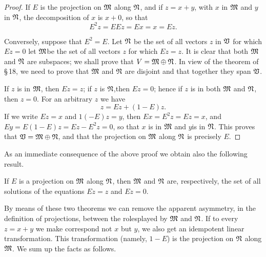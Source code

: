 \begin{proof}
    If \(E\) is the projection on \(\frak{M}\) along \(\frak{N}\), and if \(z =
    x + y\), with \(x\) in \(\frak{M}\) and \(y\) in \(\frak{N}\), the
    decomposition of \(x\) is \(x + 0\), so that
    \begin{equation*}
        E^2 z = EEz = Ex = x = Ez.
    \end{equation*}

    Conversely, suppose that \(E^2 = E\). Let \(\frak{N}\) be the set of all
    vectors \(z\) in \(\mathfrak{V}\) for which \(Ez = 0\) let \(\frak{M}\)be the set
    of all vectors \(z\) for which \(Ez = z\). It is clear that both
    \(\frak{M}\) and \(\frak{N}\) are subspaces; we shall prove that \(V =
    \frak{M} \oplus \frak{N}\). In view of the theorem of \S\,18, we need to
    prove that \(\frak{M}\) and \(\frak{N}\) are disjoint and that together they
    span \(\mathfrak{V}\).

    If \(z\) is in \(\frak{M}\), then \(Ez = z\); if \(z\) is \(\frak{N}\),then
    \(Ez = 0\); hence if \(z\) is in both \(\frak{M}\) and \(\frak{N}\), then
    \(z = 0\). For an arbitrary \(z\) we have
    \begin{equation}
        z = Ez + (1 - E)z.
    \end{equation}
    If we write \(Ez = x\) and \(1( - E)z = y\), then \(Ex = E^2z = Ez = x\),
    and \(Ey = E(1- E)z= Ez - E^2z = 0\), so that \(x\) is in \(\frak{M}\) and
    \(y\)is in \(\frak{N}\). This proves that \(\mathfrak{V} = \frak{M} \oplus
    \frak{N}\), and that the projection on \(\frak{M}\) along \(\frak{N}\) is
    precisely \(E\).
\end{proof}

As an immediate consequence of the above proof we obtain also the following result.

\begin{theorem}
    If \(E\) is a projection on \(\frak{M}\) along \(\frak{N}\), then \(\frak{M}\) and \(\frak{N}\) are, respectively, the set of all solutions of the equations \(Ez = z\) and \(Ez = 0\).
\end{theorem}

By means of these two theorems we can remove the apparent asymmetry, in the
definition of projections, between the rolesplayed by \(\frak{M}\) and
\(\frak{N}\). If to every \(z = x + y\) we make correspond not \(x\) but \(y\),
we also get an idempotent linear transformation. This transformation (namely,
\(1- E\)) is the projection on \(\frak{N}\) along \(\frak{M}\). We sum up the
facts as follows.

